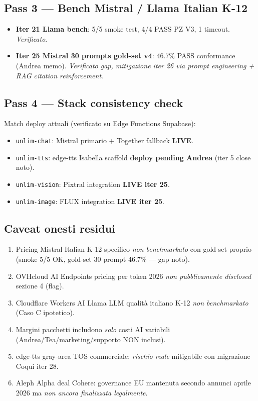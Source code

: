\documentclass[12pt,a4paper]{article}
\begin{document}
\subsection{Pass 3 --- Bench Mistral / Llama Italian K-12}

\begin{itemize}[leftmargin=*]
  \item \textbf{Iter 21 Llama bench}: 5/5 smoke test, 4/4 PASS PZ V3, 1 timeout. \emph{Verificato}.
  \item \textbf{Iter 25 Mistral 30 prompts gold-set v4}: 46.7\% PASS conformance (Andrea memo). \emph{Verificato gap, mitigazione iter 26 via prompt engineering + RAG citation reinforcement}.
\end{itemize}

\subsection{Pass 4 --- Stack consistency check}

Match deploy attuali (verificato su Edge Functions Supabase):
\begin{itemize}[leftmargin=*]
  \item \texttt{unlim-chat}: Mistral primario + Together fallback \textbf{LIVE}.
  \item \texttt{unlim-tts}: edge-tts Isabella scaffold \textbf{deploy pending Andrea} (iter 5 close noto).
  \item \texttt{unlim-vision}: Pixtral integration \textbf{LIVE iter 25}.
  \item \texttt{unlim-image}: FLUX integration \textbf{LIVE iter 25}.
\end{itemize}

\subsection{Caveat onesti residui}

\begin{enumerate}[leftmargin=*]
  \item Pricing Mistral Italian K-12 specifico \emph{non benchmarkato} con gold-set proprio (smoke 5/5 OK, gold-set 30 prompt 46.7\% --- gap noto).
  \item OVHcloud AI Endpoints pricing per token 2026 \emph{non pubblicamente disclosed} sezione 4 (flag).
  \item Cloudflare Workers AI Llama LLM qualità italiano K-12 \emph{non benchmarkato} (Caso C ipotetico).
  \item Margini pacchetti includono \emph{solo} costi AI variabili (Andrea/Tea/marketing/supporto NON inclusi).
  \item edge-tts gray-area TOS commerciale: \emph{rischio reale} mitigabile con migrazione Coqui iter 28.
  \item Aleph Alpha deal Cohere: governance EU mantenuta secondo annunci aprile 2026 ma \emph{non ancora finalizzata legalmente}.
\end{enumerate}
\end{document}
